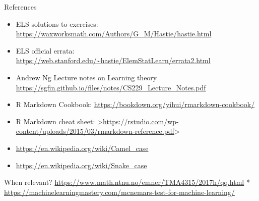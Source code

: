 \documentclass[
  ignorenonframetext,
]{beamer}
\begin{document}
\begin{frame}{References}
\protect\hypertarget{references}{}

\begin{itemize}
\item
  ELS solutions to exercises:
  \url{https://waxworksmath.com/Authors/G_M/Hastie/hastie.html}
\item
  ELS official errata:
  \url{https://web.stanford.edu/~hastie/ElemStatLearn/errata2.html}
\item
  Andrew Ng Lecture notes on Learning theory
  \url{https://sgfin.github.io/files/notes/CS229_Lecture_Notes.pdf}
\item
  R Markdown Cookbook:
  \url{https://bookdown.org/yihui/rmarkdown-cookbook/}
\item
  R Markdown cheat sheet:
  \textgreater{}\url{https://rstudio.com/wp-content/uploads/2015/03/rmarkdown-reference.pdf}\textgreater{}
\item
  \url{https://en.wikipedia.org/wiki/Camel_case}
\item
  \url{https://en.wikipedia.org/wiki/Snake_case}
\end{itemize}

When relevant?
\url{https://www.math.ntnu.no/emner/TMA4315/2017h/qq.html} *
\url{https://machinelearningmastery.com/mcnemars-test-for-machine-learning/}

\end{frame}
\end{document}

